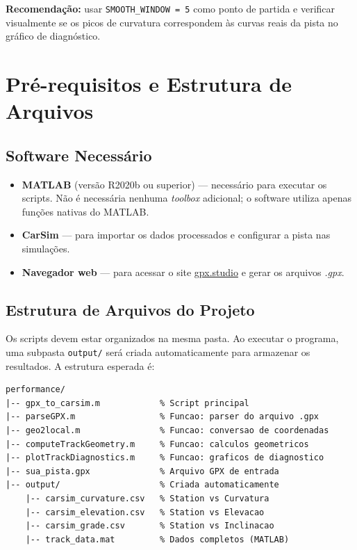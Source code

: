 \documentclass[a4paper,12pt]{article}
\begin{document}
\textbf{Recomendação:} usar \texttt{SMOOTH\_WINDOW = 5} como ponto de partida e verificar visualmente se os picos de curvatura correspondem às curvas reais da pista no gráfico de diagnóstico.


\section{Pré-requisitos e Estrutura de Arquivos}

\subsection{Software Necessário}

\begin{itemize}
    \item \textbf{MATLAB} (versão R2020b ou superior) --- necessário para executar os scripts. Não é necessária nenhuma \textit{toolbox} adicional; o software utiliza apenas funções nativas do MATLAB.
    \item \textbf{CarSim} --- para importar os dados processados e configurar a pista nas simulações.
    \item \textbf{Navegador web} --- para acessar o site \href{https://gpx.studio/}{gpx.studio} e gerar os arquivos \textit{.gpx}.
\end{itemize}

\subsection{Estrutura de Arquivos do Projeto}

Os scripts devem estar organizados na mesma pasta. Ao executar o programa, uma subpasta \texttt{output/} será criada automaticamente para armazenar os resultados. A estrutura esperada é:

\begin{lstlisting}[style=matlabstyle, language={}, caption={Estrutura de diretórios do projeto.}]
performance/
|-- gpx_to_carsim.m            % Script principal
|-- parseGPX.m                 % Funcao: parser do arquivo .gpx
|-- geo2local.m                % Funcao: conversao de coordenadas
|-- computeTrackGeometry.m     % Funcao: calculos geometricos
|-- plotTrackDiagnostics.m     % Funcao: graficos de diagnostico
|-- sua_pista.gpx              % Arquivo GPX de entrada
|-- output/                    % Criada automaticamente
    |-- carsim_curvature.csv   % Station vs Curvatura
    |-- carsim_elevation.csv   % Station vs Elevacao
    |-- carsim_grade.csv       % Station vs Inclinacao
    |-- track_data.mat         % Dados completos (MATLAB)
\end{lstlisting}
\end{document}
